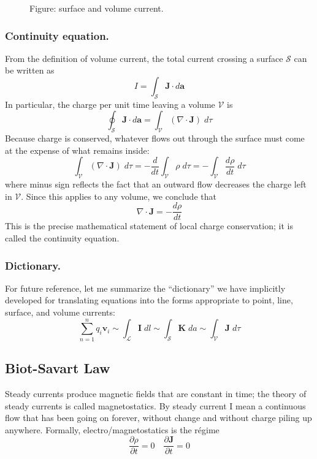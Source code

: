 \documentclass[../../../main.tex]{subfiles}
\begin{document}
\begin{figure}
    \centering
    \caption*{Figure: surface and volume current.}
\end{figure}


\subsubsection{Continuity equation.} From the definition of volume current, the total current crossing a surface $\mathcal{S}$ can be written as
\begin{equation*}
    I=\int_{\mathcal{S}}\mathbf{J}\cdot d\mathbf{a}
\end{equation*}
In particular, the charge per unit time leaving a volume $\mathcal{V}$ is
\begin{equation*}
    \oint_{\mathcal{S}} \mathbf{J}\cdot d\mathbf{a}=\int_{\mathcal{V}}(\nabla\cdot\mathbf{J}) \;d\tau
\end{equation*}
Because charge is conserved, whatever ﬂows out through the surface must come at the expense of what remains inside:
\begin{equation*}
    \int_{\mathcal{V}}(\nabla\cdot\mathbf{J}) \;d\tau=-\frac{d}{dt}\int_\mathcal{V}\rho\;d\tau= -\int_\mathcal{V}\frac{d\rho}{dt}\;d\tau
\end{equation*}
where minus sign reﬂects the fact that an outward ﬂow decreases the charge left in $\mathcal{V}$. Since this applies to any volume, we conclude that
\begin{equation*}
    \nabla\cdot\mathbf{J}=-\frac{d\rho}{dt}
\end{equation*}
This is the precise mathematical statement of local charge conservation; it is called the continuity equation.

\subsubsection{Dictionary.} For future reference, let me summarize the “dictionary” we have implicitly developed for translating equations into the forms appropriate to point, line, surface, and volume currents:
\begin{equation*}
    \sum_{n=1}^{n}q_i\mathbf{v}_i\sim\int_\mathcal{L}\mathbf{I}\;dl \sim \int_\mathcal{S}\mathbf{K}\;da \sim \int_\mathcal{V}\mathbf{J}\;d\tau
\end{equation*}

\subsection{Biot-Savart Law}
Steady currents produce magnetic fields that are constant in time; the theory of steady currents is called magnetostatics. By steady current I mean a continuous ﬂow that has been going on forever, without change and without charge piling up anywhere. Formally, electro/magnetostatics is the régime
\begin{equation*}
    \frac{\partial\rho}{\partial t}=0 \quad\frac{\partial \mathbf{J}}{\partial t}=0
\end{equation*}
\end{document}

